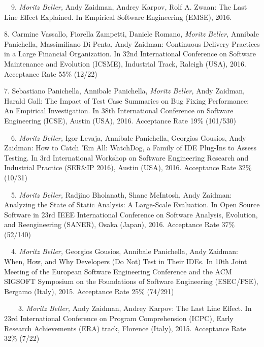 \begin{etaremune}
{\item[\faFileTextO~~9.] \emph{Moritz Beller,} Andy Zaidman, Andrey Karpov, Rolf A. Zwaan: The
  Last Line Effect Explained. In Empirical Software Engineering (EMSE), 2016.

\item[8.] Carmine Vassallo, Fiorella Zampetti, Daniele Romano, \emph{Moritz Beller,} Annibale
  Panichella, Massimiliano Di Penta, Andy Zaidman: Continuous Delivery Practices in a Large
  Financial Organization. In 32nd International Conference on Software Maintenance and Evolution
  (ICSME), Industrial Track, Raleigh (USA), 2016. Acceptance Rate 55\% (12/22)

\item[7.] Sebastiano Panichella, Annibale Panichella, \emph{Moritz Beller,} Andy Zaidman, Harald
  Gall: The Impact of Test Case Summaries on Bug Fixing Performance: An Empirical Investigation. In
  38th International Conference on Software Engineering (ICSE), Austin (USA), 2016. Acceptance Rate
  19\% (101/530)

\item[\faFileTextO~~6.] \emph{Moritz Beller,} Igor Levaja, Annibale Panichella, Georgios Gousios,
  Andy Zaidman: How to Catch ’Em All: WatchDog, a Family of IDE Plug-Ins to Assess Testing. In 3rd
  International Workshop on Software Engineering Research and Industrial Practice (SER\&IP 2016),
  Austin (USA), 2016. Acceptance Rate 32\% (10/31)

\item[\faFileTextO~~5.] \emph{Moritz Beller,} Radjino Bholanath, Shane McIntosh, Andy
  Zaidman: Analyzing the State of Static Analysis: A Large-Scale Evaluation. In Open Source
  Software in 23rd IEEE International Conference on Software Analysis, Evolution, and Reengineering
  (SANER), Osaka (Japan), 2016. Acceptance Rate 37\% (52/140)

\item[\faFileTextO~~4.] \emph{Moritz Beller,} Georgios Gousios, Annibale Panichella, Andy
  Zaidman: When, How, and Why Developers (Do Not) Test in Their IDEs. In 10th Joint Meeting of the
  European Software Engineering Conference and the ACM SIGSOFT Symposium on the Foundations of
  Software Engineering (ESEC/FSE), Bergamo (Italy), 2015. Acceptance Rate 25\% (74/291)

\item[\faTrophy~~\faFileTextO~~3.] \emph{Moritz Beller,} Andy Zaidman, Andrey Karpov: The Last
  Line Effect. In 23rd International Conference on Program Comprehension (ICPC), Early Research
  Achievements (ERA) track, Florence (Italy), 2015. Acceptance Rate 32\% (7/22)

}
\end{etaremune}
